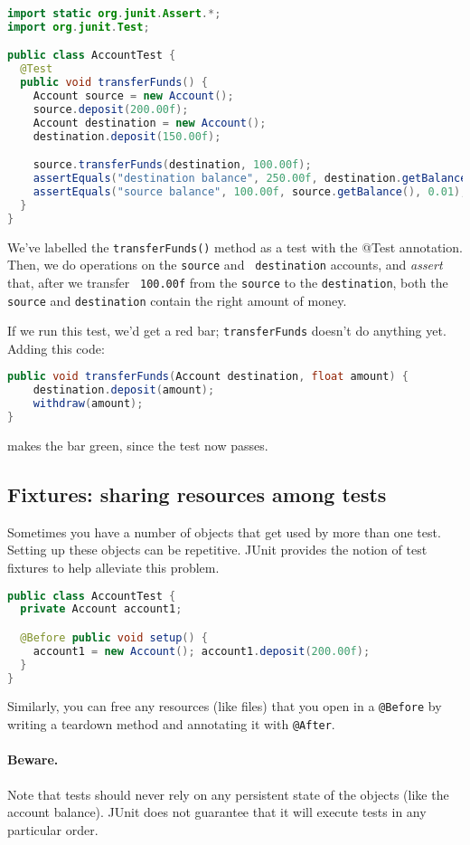 \begin{lstlisting}[language={Java}]
import static org.junit.Assert.*;
import org.junit.Test;

public class AccountTest {
  @Test
  public void transferFunds() {
    Account source = new Account();
    source.deposit(200.00f);
    Account destination = new Account();
    destination.deposit(150.00f);

    source.transferFunds(destination, 100.00f);
    assertEquals("destination balance", 250.00f, destination.getBalance(), 0.01);
    assertEquals("source balance", 100.00f, source.getBalance(), 0.01);
  }
}
\end{lstlisting}
We've labelled the {\tt transferFunds()} method as a test with the
@Test annotation. Then, we do operations on the {\tt source} and {\tt
  destination} accounts, and {\em assert} that, after we transfer {\tt
  100.00f} from the {\tt source} to the {\tt destination}, both the
{\tt source} and {\tt destination} contain the right amount of money.

If we run this test, we'd get a red bar; {\tt transferFunds} doesn't
do anything yet. Adding this code:

\begin{lstlisting}[language={Java}]
public void transferFunds(Account destination, float amount) {
    destination.deposit(amount);
    withdraw(amount);
}
\end{lstlisting}
makes the bar green, since the test now passes.


\subsection*{Fixtures: sharing resources among tests}
Sometimes you have a number of objects that get used by more than
one test. Setting up these objects can be repetitive. JUnit provides
the notion of test fixtures to help alleviate this problem.

\begin{lstlisting}[language={Java}]
public class AccountTest {
  private Account account1;

  @Before public void setup() {
    account1 = new Account(); account1.deposit(200.00f);
  }
}
\end{lstlisting}

Similarly, you can free any resources (like files) that you open 
in a {\tt @Before} by writing a teardown method and annotating it
with {\tt @After}.

\paragraph{Beware.} Note that tests should never rely on any
persistent state of the objects (like the account balance).  JUnit
does not guarantee that it will execute tests in any particular order.

